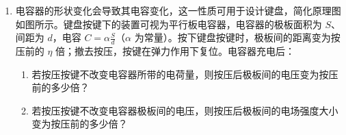 \documentclass[\gkver]{gaokaozhenti}
\begin{document}
\begin{enumerate}
{（2）根据线性元件与非线性原件的定义由图（a）可知，所测元件的伏安特性曲线不是直线，所以所测元件是非线性电阻元件。

根据 $R = \frac{U}{I}$，在伏安特性曲线上某点与原点连线的斜率的倒数表示电阻，随着电流的增加，曲线某点与原点连线的斜率逐渐增大，其倒数逐渐减小，所以元件的电阻减小。

（3）将电流表 A$_{1}$ 与 $R_{x}$ 并联，再与电流表 A$_{2}$、定值电阻 $R_{0}$ 串联接入电路。电路图如图所示


根据并联电路电压相等有 $I_{1}r_{1} = (I_{2} - I_{1})R_{x}$

可得 $R_{x} = \frac{I_{1}r_{1}}{I_{2} - I_{1}}$
}

\item
电容器的形状变化会导致其电容变化，这一性质可用于设计键盘，简化原理图如图所示。键盘按键下的装置可视为平行板电容器，电容器的极板面积为 $S$、间距为 $d$，电容 $C = \alpha \frac{S}{d}$（$\alpha$ 为常量）。按下键盘按键时，极板间的距离变为按压前的 $\eta$ 倍；撤去按压，按键在弹力作用下复位。电容器充电后：
\begin{enumerate}
	\item
	若按压按键不改变电容器所带的电荷量，则按压后极板间的电压变为按压前的多少倍？
	\item
	若按压按键不改变电容器极板间的电压，则按压后极板间的电场强度大小变为按压前的多少倍？
\end{enumerate}


\end{enumerate}
\end{document}
